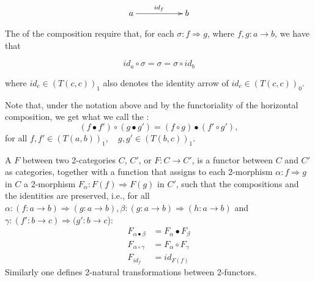 \[
 \xymatrix{a\ar[rr]^{id_f} && b}
\]

The  of the composition require that, for each $\sigma:f\Rightarrow g$, where $f,g:a\rightarrow b$, we have that

\[ id_a \circ \sigma = \sigma = \sigma \circ id_b \]

where $id_c\in (T(c,c))_1$ also denotes the identity arrow of $id_c\in (T(c,c))_0$.


Note that, under the notation above and by the functoriality of the horizontal composition, we get what we call the :\begin{equation}
(f\bullet f')\circ (g\bullet g')=(f\circ g)\bullet (f'\circ g'),\label{interchangelaw}
\end{equation}
for all $f,f'\in (T(a,b))_{1},\quad g,g'\in (T(b,c))_{1}$.



\begin{definition}
A  $F$ between two 2-categories $C$, $C'$, or $F:C\rightarrow C'$, is a functor between $C$ and $C'$ as categories, together with a function that assigns to each 2-morphism $\alpha:f\Rightarrow g$ in $C$ a 2-morphism $F_\alpha:F(f)\Rightarrow F(g)$ in $C'$, such that the compositions and the identities are preserved, i.e., for all $\alpha:(f:a\rightarrow b) \Rightarrow (g:a\rightarrow b), \beta:(g:a\rightarrow b)\Rightarrow (h:a\rightarrow b)$ and $\gamma:(f':b\rightarrow c) \Rightarrow (g':b\rightarrow c$):
\begin{align}
F_{\alpha \bullet \beta}&=F_{\alpha}\bullet F_{\beta}\\
F_{\alpha \circ \gamma}&=F_{\alpha}\circ F_{\gamma}\\
F_{id_f} &= id_{F(f)}
\end{align}
Similarly one defines 2-natural transformations between 2-functors.
\end{definition}

